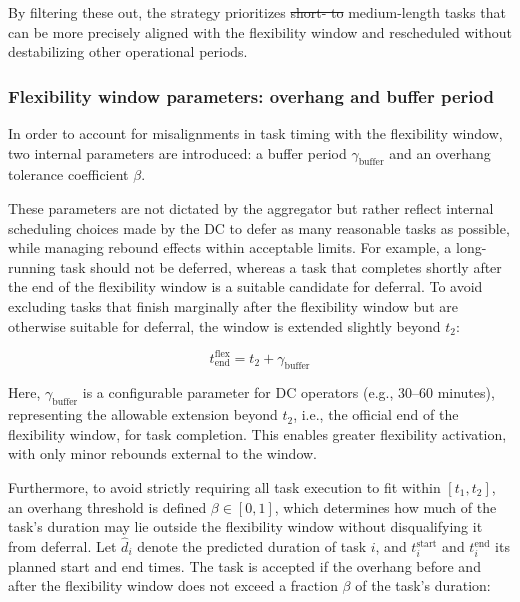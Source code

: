 \documentclass[preprint,12pt]{elsarticle}
\makeatletter
\providecommand{\DIFaddtex}[1]{{\protect\color{blue}\uwave{#1}}} %
\providecommand{\DIFdeltex}[1]{{\protect\color{red}\sout{#1}}} %
\providecommand{\DIFaddbegin}{} %
\providecommand{\DIFaddend}{} %
\providecommand{\DIFdelbegin}{} %
\providecommand{\DIFdelend}{} %
\providecommand{\DIFadd}[1]{\texorpdfstring{\DIFaddtex{#1}}{#1}} %
\providecommand{\DIFdel}[1]{\texorpdfstring{\DIFdeltex{#1}}{}} %
\providecommand{\DIFscaledelfig}{0.5}
\newlength{\DIFdelgraphicswidth} %
\newlength{\DIFdelgraphicsheight} %
\providecommand{\DIFaddincludegraphics}[2][]{{\color{blue}\fbox{\DIFOincludegraphics[#1]{#2}}}} %
\providecommand{\DIFdelincludegraphics}[2][]{%
\sbox{\DIFdelgraphicsbox}{\DIFOincludegraphics[#1]{#2}}%
\settoboxwidth{\DIFdelgraphicswidth}{\DIFdelgraphicsbox} %
\settoboxtotalheight{\DIFdelgraphicsheight}{\DIFdelgraphicsbox} %
\scalebox{\DIFscaledelfig}{%
\parbox[b]{\DIFdelgraphicswidth}{\usebox{\DIFdelgraphicsbox}\\[-\baselineskip] \rule{\DIFdelgraphicswidth}{0em}}\llap{\resizebox{\DIFdelgraphicswidth}{\DIFdelgraphicsheight}{%
\setlength{\unitlength}{\DIFdelgraphicswidth}%
\begin{picture}(1,1)%
\thicklines\linethickness{2pt} %
{\color[rgb]{1,0,0}\put(0,0){\framebox(1,1){}}}%
{\color[rgb]{1,0,0}\put(0,0){\line( 1,1){1}}}%
{\color[rgb]{1,0,0}\put(0,1){\line(1,-1){1}}}%
\end{picture}%
}\hspace*{3pt}}} %
} %
\DeclareRobustCommand{\DIFaddbegin}{\DIFOaddbegin \let\includegraphics\DIFaddincludegraphics} %
\DeclareRobustCommand{\DIFaddend}{\DIFOaddend \let\includegraphics\DIFOincludegraphics} %
\DeclareRobustCommand{\DIFdelbegin}{\DIFOdelbegin \let\includegraphics\DIFdelincludegraphics} %
\DeclareRobustCommand{\DIFdelend}{\DIFOaddend \let\includegraphics\DIFOincludegraphics} %
\let\sout@orig\sout %
\renewcommand{\sout}[1]{\ifmmode\text{\sout@orig{\ensuremath{#1}}}\else\sout@orig{#1}\fi} %
\makeatother
\begin{document}
By filtering these out, the strategy prioritizes \DIFdelbegin \DIFdel{short- to }\DIFdelend \DIFaddbegin \DIFadd{short and }\DIFaddend medium-length tasks that can be more precisely aligned with the flexibility window and rescheduled without destabilizing other operational periods.


\subsubsection{Flexibility window parameters: overhang and buffer period}


In order to account for misalignments in task timing with the flexibility window, two internal parameters are introduced: a buffer period $\gamma_{\text{buffer}}$ and an overhang tolerance coefficient $\beta$.

These parameters are not dictated by the aggregator but rather reflect internal scheduling choices made by the DC to defer as many reasonable tasks as possible, while managing rebound effects within acceptable limits. %
For example, a long-running task should not be deferred, whereas a task that completes shortly after the end of the flexibility window is a suitable candidate for deferral.
To avoid excluding tasks that finish marginally after the flexibility window but are otherwise suitable for deferral, the window is extended slightly beyond $t_2$:

\begin{equation}
    t_{\text{end}}^{\text{flex}} = t_2 + \gamma_{\text{buffer}}
\end{equation}

Here, $\gamma_{\text{buffer}}$ is a configurable parameter for DC operators (e.g., 30–60 minutes), representing the allowable extension beyond $t_2 $, i.e.,  the official end of the flexibility window, for task completion. This enables greater flexibility activation, with only minor rebounds external to the window.

Furthermore, to avoid strictly requiring all task execution to fit within $[t_1, t_2]$, an overhang threshold is defined $\beta \in [0, 1]$, which determines how much of the task's duration may lie outside the flexibility window without disqualifying it from deferral. Let $\hat{d}_i$ denote the predicted duration of task $i$, and $t_i^{\text{start}}$ and $t_i^{\text{end}}$ its planned start and end times. The task is accepted if the overhang before and after the flexibility window does not exceed a fraction $\beta$ of the task's duration:
\end{document}
